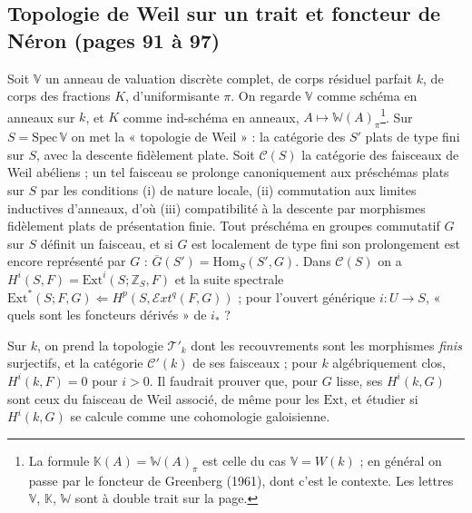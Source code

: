 \documentclass[11pt,a4paper]{article}
\begin{document}
\subsection*{Topologie de Weil sur un trait et foncteur de Néron (pages 91 à 97)}

Soit $\mathbb{V}$ un anneau de valuation discrète complet, de corps résiduel
parfait $k$, de corps des fractions $K$, d'uniformisante $\pi$. On regarde
$\mathbb{V}$ comme schéma en anneaux sur $k$, et $K$ comme ind-schéma en anneaux,
$A \mapsto \mathbb{W}(A)_\pi$\footnote{La formule $\mathbb{K}(A) = \mathbb{W}(A)_\pi$
est celle du cas $\mathbb{V} = W(k)$ ; en général on passe par le foncteur de
Greenberg (1961), dont c'est le contexte. Les lettres $\mathbb{V}$, $\mathbb{K}$,
$\mathbb{W}$ sont à double trait sur la page.}. Sur $S = \mathrm{Spec}\,\mathbb{V}$
on met la « topologie de Weil » : la catégorie des $S'$ plats de type fini sur
$S$, avec la descente fidèlement plate. Soit $\mathcal{C}(S)$ la catégorie des
faisceaux de Weil abéliens ; un tel faisceau se prolonge canoniquement aux
préschémas plats sur $S$ par les conditions (i) de nature locale, (ii) commutation
aux limites inductives d'anneaux, d'où (iii) compatibilité à la descente par
morphismes fidèlement plats de présentation finie. Tout préschéma en groupes
commutatif $G$ sur $S$ définit un faisceau, et si $G$ est localement de type fini
son prolongement est encore représenté par $G$ : $\overline{G}(S') =
\mathrm{Hom}_S(S', G)$. Dans $\mathcal{C}(S)$ on a $H^i(S, F) = \mathrm{Ext}^i(S;
\mathbb{Z}_S, F)$ et la suite spectrale $\mathrm{Ext}^{*}(S; F, G) \Leftarrow
H^p(S, \mathcal{E}xt^q(F, G))$ ; pour l'ouvert générique $i : U \to S$, « quels sont
les foncteurs dérivés » de $i_*$ ?

Sur $k$, on prend la topologie $\mathcal{T}'_k$ dont les recouvrements sont les
morphismes \emph{finis} surjectifs, et la catégorie $\mathcal{C}'(k)$ de ses
faisceaux ; pour $k$ algébriquement clos, $H^i(k, F) = 0$ pour $i > 0$. Il
faudrait prouver que, pour $G$ lisse, ses $H^i(k, G)$ sont ceux du faisceau de
Weil associé, de même pour les $\mathrm{Ext}$, et étudier si $H^i(k, G)$ se calcule
comme une cohomologie galoisienne.
\end{document}
